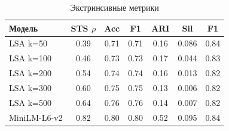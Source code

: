 \begin{table}[H]
  \centering
  \begin{tabular}{|l|c|c|c|c|c|c|}
    \hline
    Модель & STS $\rho$ & Acc & F1 & ARI & Sil & F1 \\
    \hline
    LSA k=50 & 0.39 & 0.71 & 0.71 & 0.16 & 0.086 & 0.84 \\
    LSA k=100 & 0.46 & 0.73 & 0.73 & 0.17 & 0.044 & 0.83 \\
    LSA k=200 & 0.54 & 0.74 & 0.74 & 0.16 & 0.013 & 0.82 \\
    LSA k=300 & 0.60 & 0.75 & 0.75 & 0.13 & 0.006 & 0.82 \\
    LSA k=500 & 0.64 & 0.76 & 0.76 & 0.14 & 0.007 & 0.82 \\
    MiniLM-L6-v2 & 0.82 & 0.80 & 0.80 & 0.52 & 0.095 & 0.84 \\
    \hline
  \end{tabular}
  \caption{Экстринсивные метрики}
\end{table}
